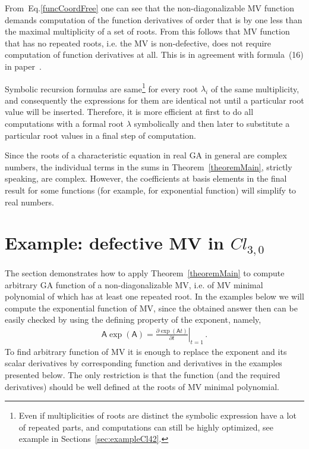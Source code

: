 \documentclass[AMA,STIX1COL]{WileyNJD-v2}
\def\m#1{\mathsf{#1}} %
\newcommand{\cl}[2]{\ensuremath{\mathit{Cl}_{#1,#2}}}
\def\m#1{\mathsf{#1}}%
\begin{document}
\begin{remark}
  From~Eq.\eqref{funcCoordFree} one can see that the non-diagonalizable MV function demands computation of the function
 derivatives of order that is by one less than the maximal multiplicity of a set of roots. From this  follows that MV function
 that has no repeated roots, i.e. the MV is non-defective, does not require computation of function derivatives at all.
 This is in agreement with formula~(16) in paper~\cite{AcusMMAS2023}.
\end{remark}

\begin{remark}[Evaluation]
Symbolic recursion formulas are same\footnote{Even if multiplicities of roots are distinct the symbolic expression have a lot of repeated parts, and computations can still
be highly optimized, see example in Sections~\ref{sec:exampleCl42}.} for every root $\lambda_i$ of the same multiplicity,  and consequently the
expressions for them are identical not until a particular root value will be inserted. Therefore, it is more efficient at first to do
all computations with a formal root $\lambda$ symbolically and then  later to substitute a particular root values in a final step of
computation.
\end{remark}


Since the roots of a characteristic equation in real GA  in general are
complex numbers, the individual terms in the sums in Theorem~\ref{theoremMain}, strictly
speaking, are complex. However, the coefficients at basis elements
in the final result for some functions (for example, for exponential function) will simplify to real numbers.


\section{Example: defective MV in  \cl{3}{0}}\label{sec:exampleCl30}

The section  demonstrates how to apply Theorem~\ref{theoremMain} to compute arbitrary GA function of a non-diagonalizable
MV, i.e. of MV minimal polynomial of which has at least one repeated root.
In the examples below we will compute the exponential function of MV, since the obtained answer
then can be easily checked by using the defining property of the exponent, namely,
\begin{align}
\m{A}\exp(\m{A})=\left.\frac{\partial\exp(\m{A}t)}{\partial t}\right|_{t=1}\,.\label{expproperty}
\end{align}
To find arbitrary function of MV it is enough to replace the exponent and its scalar derivatives by corresponding function and
derivatives  in the examples presented  below. The only restriction is that the function (and the required derivatives) should be well defined
at the roots of MV minimal polynomial.
\end{document}
